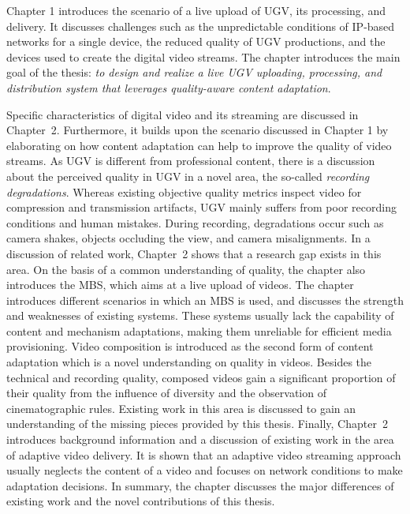 Chapter 1 introduces the scenario of a live upload of \acf{UGV}, its processing, and delivery.
It discusses challenges such as the unpredictable conditions of \ac{IP}-based networks for a single device, the reduced quality of \ac{UGV} productions, and the devices used to create the digital video streams.
The chapter introduces the main goal of the thesis: \emph{to design and realize a live \ac{UGV} uploading, processing, and distribution system that leverages quality-aware content adaptation}.

Specific characteristics of digital video and its streaming are discussed in Chapter~2. 
Furthermore, it builds upon the scenario discussed in Chapter 1 by elaborating on how content adaptation can help to improve the quality of video streams.
As \ac{UGV} is different from professional content, there is a discussion about the perceived quality in \ac{UGV} in a novel area, the so-called \emph{recording degradations}.
Whereas existing objective quality metrics inspect video for compression and transmission artifacts, \ac{UGV} mainly suffers from poor recording conditions and human mistakes.
During recording, degradations occur such as camera shakes, objects occluding the view, and camera misalignments.
In a discussion of related work, Chapter~2 shows that a research gap exists in this area.
On the basis of a common understanding of quality, the chapter also introduces the \acf{MBS}, which aims at a live upload of videos.
The chapter introduces different scenarios in which an \ac{MBS} is used, and discusses the strength and weaknesses of existing systems.
These systems usually lack the capability of content and mechanism adaptations, making them unreliable for efficient media provisioning.
Video composition is introduced as the second form of content adaptation which is a novel understanding on quality in videos. 
Besides the technical and recording quality, composed videos gain a significant proportion of their quality from the influence of diversity and the observation of cinematographic rules.
Existing work in this area is discussed to gain an understanding of the missing pieces provided by this thesis.
Finally, Chapter~2 introduces background information and a discussion of existing work in the area of adaptive video delivery.
It is shown that an adaptive video streaming approach usually neglects the content of a video and focuses on network conditions to make adaptation decisions.
In summary, the chapter discusses the major differences of existing work and the novel contributions of this thesis.

